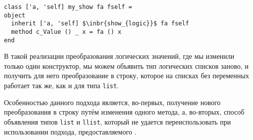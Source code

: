 \begin{lstlisting}
class ['a, 'self] my_show fa fself = 
object
  inherit ['a, 'self] $\inbr{show_{logic}}$ fa fself
  method c_Value () _ x = fa () x
end
\end{lstlisting}
В такой реализации преобразования логических значений, где мы изменили только один конструктор, мы можем объявить тип логических списков заново, и получить для него преобразование в строку, которое на списках без переменных работает так же, как и для типа \lstinline{list}.

Особенностью данного подхода является, во-первых, получение нового преобразования в строку путём изменения одного метода, а, во-вторых, способ объявления типов \lstinline{list} и \lstinline{llist}, который не удается переиспользовать при использовании подхода, предоставляемого \visitors{}.

%

%
%
%

%
%
%


